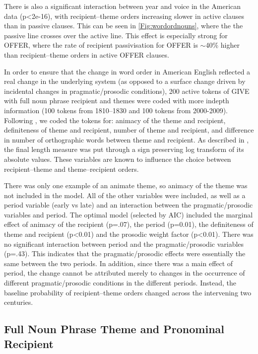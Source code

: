 There is also a significant interaction between year and voice in the American data (p\textless 2e-16), with recipient--theme orders increasing slower in active clauses than in passive clauses. This can be seen in \ref{Fig:wordordnouns}, where the the passive line crosses over the active line. This effect is especially strong for OFFER, where the rate of recipient passivisation for OFFER is $\sim$40\% higher than recipient--theme orders in active OFFER clauses. 

In order to ensure that the change in word order in American English reflected a real change in the underlying system (as opposed to a surface change driven by incidental changes in pragmatic/prosodic conditions), 200 active tokens of GIVE with full noun phrase recipient and themes were coded with more indepth information (100 tokens from 1810--1830 and 100 tokens from 2000-2009). Following \cite{Bresnan.2009}, we coded the tokens for: animacy of the theme and recipient, definiteness of theme and recipient, number of theme and recipient, and difference in number of orthographic words between theme and recipient. As described in \cite{Bresnan.2009}, the final length measure was put through a sign preserving log transform of its absolute values. These variables are known to influence the choice between recipient--theme and theme--recipient orders.

There was only one example of an animate theme, so animacy of the theme was not included in the model. All of the other variables were included, as well as a period variable (early vs late) and an interaction between the pragmatic/prosodic variables and period. The optimal model (selected by AIC) included the marginal effect of animacy of the recipient (p=.07), the period (p=0.01), the definiteness of theme and recipient (p\textless 0.01) and the prosodic weight factor (p\textless 0.01). There was no significant interaction between period and the pragmatic/prosodic variables (p=.43). This indicates that the pragmatic/prosodic effects were essentially the same between the two periods. In addition, since there was a main effect of period, the change cannot be attributed merely to changes in the occurrence of different pragmatic/prosodic conditions in the different periods. Instead, the baseline probability of recipient--theme orders changed across the intervening two centuries.

\subsection{Full Noun Phrase Theme and Pronominal Recipient}


